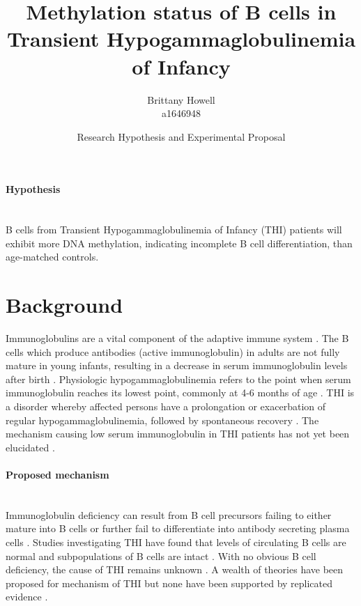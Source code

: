 \documentclass[12pt]{article}
\title{Methylation status of B cells in Transient Hypogammaglobulinemia of Infancy}
\date{Research Hypothesis and Experimental Proposal}
\author{Brittany Howell \\ a1646948}
\begin{document}
	\maketitle
	
	\paragraph{Hypothesis}
	~\\
	B cells from Transient Hypogammaglobulinemia of Infancy (THI) patients will exhibit more DNA methylation, indicating incomplete B cell differentiation, than age-matched controls.
	
	\section{Background}
	
		Immunoglobulins are a vital component of the adaptive immune system \citep{Simon15}.  
		The B cells which produce antibodies (active immunoglobulin) in adults are not fully mature in young infants, resulting in a decrease in serum immunoglobulin levels after birth \citep{Martin10,Rechavi15,Stiemh80}. 
		Physiologic hypogammaglobulinemia refers to the point when serum immunoglobulin reaches its lowest point, commonly at 4-6 months of age \citep{Dressler89}. 
		THI is a disorder whereby affected persons have a prolongation or exacerbation of regular hypogammaglobulinemia, followed by spontaneous recovery \citep{Stiemh80,Dressler89,AlHerz14,Gitlin56,AlHerz11,Rosen66,McGeady87, Dalal98,Tiller78,Buckley83}.
		The mechanism causing low serum immunoglobulin in THI patients has not yet been elucidated \citep{AlHerz14}. 

	
		\paragraph{Proposed mechanism} 
			~\\
			Immunoglobulin deficiency can result from B cell precursors failing to either mature into B cells or further fail to differentiate into antibody secreting plasma cells \citep{Fiorilli86}. 
			Studies investigating THI have found that levels of circulating B cells are normal and subpopulations of B cells are intact \citep{Tiller78,Stiemh80,Siegel81,Buckley83,Fiorilli86,Dressler89}.
			With no obvious B cell deficiency, the cause of THI remains unknown \citep{AlHerz14}. 
			A wealth of theories have been proposed for mechanism of THI but none have been supported by replicated evidence \citep{Fudenberg64,Rosen66,Nathenson71,Willenbockel60,Soothill68,Tiller78,Fiorilli86,Ovadia14,Siegel81,McGeady87}.
			
\end{document}
